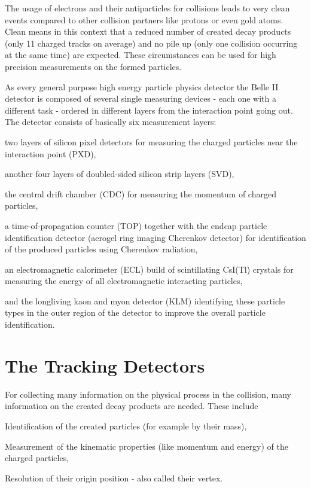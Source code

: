 The usage of electrons and their antiparticles for collisions leads to very clean events compared to other collision partners like protons or even gold atoms. Clean means in this context that a reduced number of created decay products (only 11 charged tracks on average) and no pile up (only one collision occurring at the same time) are expected. These circumstances can be used for high precision measurements on the formed particles.

As every general purpose high energy particle physics detector the Belle II detector is composed of several single measuring devices - each one with a different task - ordered in different layers from the interaction point going out. The detector consists of basically six measurement layers:
\begin{zlist}
  \item two layers of silicon pixel detectors for measuring the charged particles near the interaction point (PXD),
  \item another four layers of doubled-sided silicon strip layers (SVD),
  \item the central drift chamber (CDC) for measuring the momentum of charged particles,
  \item a time-of-propagation counter (TOP) together with the endcap particle identification detector (aerogel ring imaging Cherenkov detector) for identification of the produced particles using Cherenkov radiation,
  \item an electromagnetic calorimeter (ECL) build of scintillating CsI(Tl) crystals for measuring the energy of all electromagnetic interacting particles,
  \item and the longliving kaon and myon detector (KLM) identifying these particle types in the outer region of the detector to improve the overall particle identification.
\end{zlist}


\section{The Tracking Detectors}

For collecting many information on the physical process in the collision, many information on the created decay products are needed. These include
\begin{zlist}
 \item Identification of the created particles (for example by their mass),
 \item Measurement of the kinematic properties (like momentum and energy) of the charged particles,
 \item Resolution of their origin position - also called their vertex.
\end{zlist}

